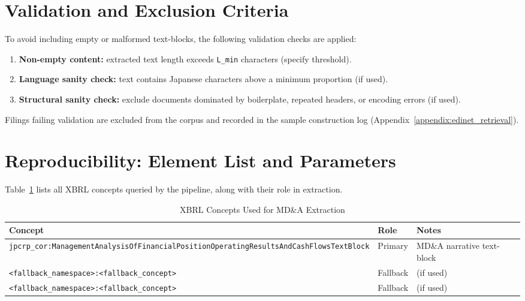 \section{Validation and Exclusion Criteria}
\label{appendix:mdna_validation}

To avoid including empty or malformed text-blocks, the following validation checks are applied:

\begin{enumerate}
  \item \textbf{Non-empty content:} extracted text length exceeds \texttt{L\_min} characters (specify threshold).
  \item \textbf{Language sanity check:} text contains Japanese characters above a minimum proportion (if used).
  \item \textbf{Structural sanity check:} exclude documents dominated by boilerplate, repeated headers, or encoding errors (if used).
\end{enumerate}

\noindent Filings failing validation are excluded from the corpus and recorded in the sample construction log (Appendix~\ref{appendix:edinet_retrieval}).

\section{Reproducibility: Element List and Parameters}
\label{appendix:mdna_params}

Table~\ref{tab:mdna_elements} lists all XBRL concepts queried by the pipeline, along with their role in extraction.

\begin{table}[h]
\centering
\caption{XBRL Concepts Used for MD\&A Extraction}
\label{tab:mdna_elements}
\begin{tabular}{lll}
\toprule
\textbf{Concept} & \textbf{Role} & \textbf{Notes} \\
\midrule
\texttt{jpcrp\_cor:ManagementAnalysisOfFinancialPositionOperatingResultsAndCashFlowsTextBlock}
  & Primary & MD\&A narrative text-block \\
\texttt{<fallback\_namespace>:<fallback\_concept>} & Fallback & (if used) \\
\texttt{<fallback\_namespace>:<fallback\_concept>} & Fallback & (if used) \\
\bottomrule
\end{tabular}
\end{table}

